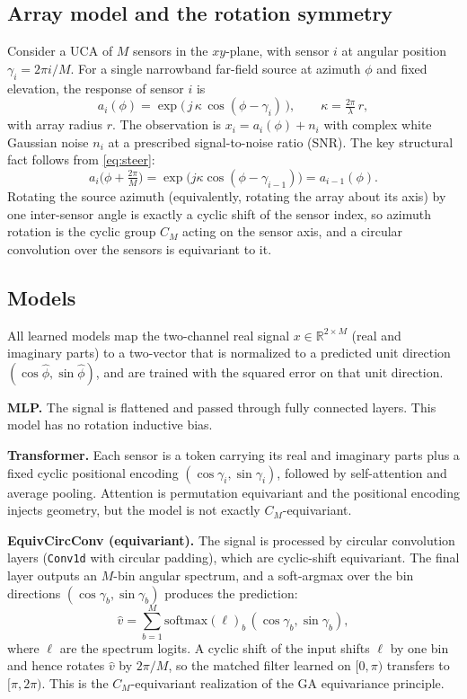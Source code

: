 \documentclass[conference]{IEEEtran}
\begin{document}
\subsection{Array model and the rotation symmetry}
Consider a UCA of $M$ sensors in the $xy$-plane, with sensor $i$ at angular
position $\gamma_i = 2\pi i/M$. For a single narrowband far-field source at azimuth
$\phi$ and fixed elevation, the response of sensor $i$ is
\begin{equation}
a_i(\phi) = \exp\!\big(\,j\,\kappa\,\cos(\phi-\gamma_i)\,\big),
\qquad \kappa = \tfrac{2\pi}{\lambda}\,r,
\label{eq:steer}
\end{equation}
with array radius $r$. The observation is $x_i = a_i(\phi) + n_i$ with complex
white Gaussian noise $n_i$ at a prescribed signal-to-noise ratio (SNR). The key
structural fact follows from \eqref{eq:steer}:
\begin{equation}
a_i\!\big(\phi + \tfrac{2\pi}{M}\big)
= \exp\!\big(j\kappa\cos(\phi-\gamma_{i-1})\big)
= a_{i-1}(\phi).
\label{eq:shift}
\end{equation}
Rotating the source azimuth (equivalently, rotating the array about its axis) by
one inter-sensor angle is exactly a cyclic shift of the sensor index, so azimuth
rotation is the cyclic group $C_M$ acting on the sensor axis, and a circular
convolution over the sensors is equivariant to it.

\subsection{Models}
All learned models map the two-channel real signal $x\in\mathbb{R}^{2\times M}$
(real and imaginary parts) to a two-vector that is normalized to a predicted unit
direction $(\cos\hat\phi,\sin\hat\phi)$, and are trained with the squared error on
that unit direction.

\textbf{MLP.} The signal is flattened and passed through fully connected layers.
This model has no rotation inductive bias.

\textbf{Transformer.} Each sensor is a token carrying its real and imaginary parts
plus a fixed cyclic positional encoding $(\cos\gamma_i,\sin\gamma_i)$, followed by
self-attention and average pooling. Attention is permutation equivariant and the
positional encoding injects geometry, but the model is not exactly
$C_M$-equivariant.

\textbf{EquivCircConv (equivariant).} The signal is processed by circular
convolution layers (\texttt{Conv1d} with circular padding), which are
cyclic-shift equivariant. The final layer outputs an $M$-bin angular spectrum, and
a soft-argmax over the bin directions $(\cos\gamma_b,\sin\gamma_b)$ produces the
prediction:
\begin{equation}
\hat{v} = \sum_{b=1}^{M} \mathrm{softmax}(\ell)_b
          \,(\cos\gamma_b,\sin\gamma_b),
\end{equation}
where $\ell$ are the spectrum logits. A cyclic shift of the input shifts $\ell$ by
one bin and hence rotates $\hat v$ by $2\pi/M$, so the matched filter learned on
$[0,\pi)$ transfers to $[\pi,2\pi)$. This is the $C_M$-equivariant realization of
the GA equivariance principle.
\end{document}

